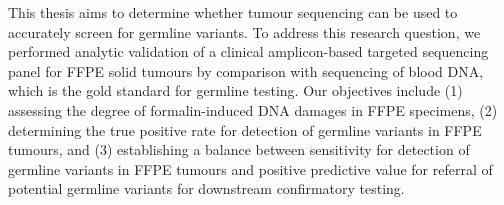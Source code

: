 This thesis aims to determine whether tumour sequencing can be used to accurately screen for germline variants. To address this research question, we performed analytic validation of a clinical amplicon-based targeted sequencing panel for FFPE solid tumours by comparison with sequencing of blood DNA, which is the gold standard for germline testing. Our objectives include (1) assessing the degree of formalin-induced DNA damages in FFPE specimens, (2) determining the true positive rate for detection of germline variants in FFPE tumours, and (3) establishing a balance between sensitivity for detection of germline variants in FFPE tumours and positive predictive value for referral of potential germline variants for downstream confirmatory testing.

